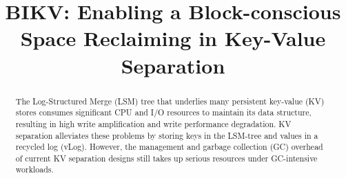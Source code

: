 \documentclass[sigconf]{acmart}
\begin{document}
	
\title{BIKV: Enabling a Block-conscious Space Reclaiming in Key-Value Separation}

\begin{abstract}
The Log-Structured Merge (LSM) tree that underlies many persistent key-value (KV) stores consumes significant CPU and I/O resources to maintain its data structure, resulting in high write amplification and write performance degradation. KV separation alleviates these problems by storing keys in the LSM-tree and values in a recycled log (vLog). However, the management and garbage collection (GC) overhead of current KV separation designs still takes up serious resources under GC-intensive workloads.


\end{abstract}
\end{document}
